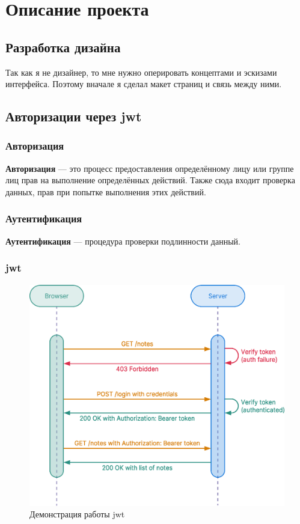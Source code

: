 \section{Описание проекта}
\subsection{Разработка дизайна}
Так как я не дизайнер, то мне нужно оперировать концептами и эскизами интерфейса. Поэтому вначале я сделал макет страниц и связь между ними.

\subsection{Авторизации через \acrfull{jwt}}

\subsubsection{Авторизация}
\textbf{Авторизация} --- это процесс предоставления определённому лицу или группе лиц прав на выполнение определённых действий. Также сюда входит проверка данных, прав при попытке выполнения этих действий.

\subsubsection{Аутентификация}
\textbf{Аутентификация} --- процедура проверки подлинности данный.

\subsubsection{\acrfull{jwt}}
\begin{figure}[h!]
    \begin{center}
        \includegraphics[scale=0.4]{images/jwt-example.eps}
        \caption{Демонстрация работы \acrshort{jwt}}
    \end{center}
\end{figure}

